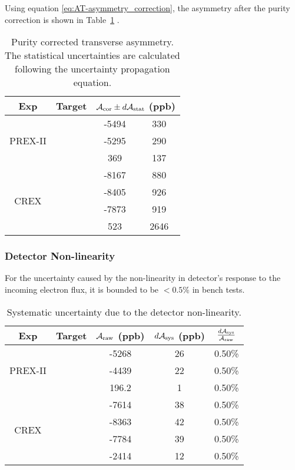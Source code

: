 Using equation \ref{eq:AT-asymmetry_correction}, the asymmetry after the purity correction
is shown in Table~\ref{tab:purity_corrected_asymmetry} .
\begin{table}
    \centering
    \begin{tabular}{c c | c c }
	\hline
	Exp & Target	
	& \multicolumn{2}{c}{$\mathcal{A}_{\text{cor}}  \pm d\mathcal{A}_{\text{stat}}$ (ppb)}	    \\
	\hline
	\multirow{3}{*}{PREX-II}
	    & \C    & -5494	& 330	 \\ 
	    & \Ca   & -5295	& 290	 \\ 
	    & \Pb   & 369	& 137	 \\ 
	\hline
	\multirow{4}{*}{CREX}
	    & \C    & -8167	& 880	 \\ 
	    & \ca   & -8405	& 926	 \\ 
	    & \Ca   & -7873	& 919	 \\ 
	    & \Pb   & 523	& 2646	 \\ 
	\hline
    \end{tabular}
    \caption{Purity corrected transverse asymmetry. The statistical uncertainties
    are calculated following the uncertainty propagation equation.}
    \label{tab:purity_corrected_asymmetry}
\end{table}

\subsubsection{Detector Non-linearity}
For the uncertainty caused by the non-linearity in detector's response to the incoming electron flux,
it is bounded to be $<0.5\%$ in bench tests.
\begin{table}[!h]
    \centering
    \begin{tabular}{c c | c c c}
	\hline
	Exp & Target	& $\mathcal{A}_{\text{raw}}$ (ppb) & $d\mathcal{A}_{\text{sys}}$ (ppb)    & $\frac{d\mathcal{A}_{\text{sys}}}{\mathcal{A}_{\text{raw}}}$   \\
	\hline
	\multirow{3}{*}{PREX-II}
	    & \C    & -5268	& 26	& 0.50\%    \\ 
	    & \ca   & -4439	& 22	& 0.50\%    \\ 
	    & \Pb   & 196.2	& 1	& 0.50\%    \\ 
	\hline
	\multirow{4}{*}{CREX}
	    & \C    & -7614	& 38	& 0.50\%    \\ 
	    & \ca   & -8363	& 42	& 0.50\%    \\ 
	    & \Ca   & -7784	& 39	& 0.50\%    \\ 
	    & \Pb   & -2414	& 12	& 0.50\%    \\ 
	\hline
    \end{tabular}
    \caption{Systematic uncertainty due to the detector non-linearity.}
\end{table}

